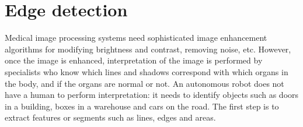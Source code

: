 \section{Edge detection}\label{s.edge-detection}

Medical image processing systems need sophisticated image enhancement algorithms for modifying brightness and contrast, removing noise, etc. However, once the image is enhanced, interpretation of the image is performed by specialists who know which lines and shadows correspond with which organs in the body, and if the organs are normal or not. An autonomous robot does not have a human to perform interpretation: it needs to identify objects such as doors in a building, boxes in a warehouse and cars on the road. The first step is to extract features or segments such as lines, edges and areas.

